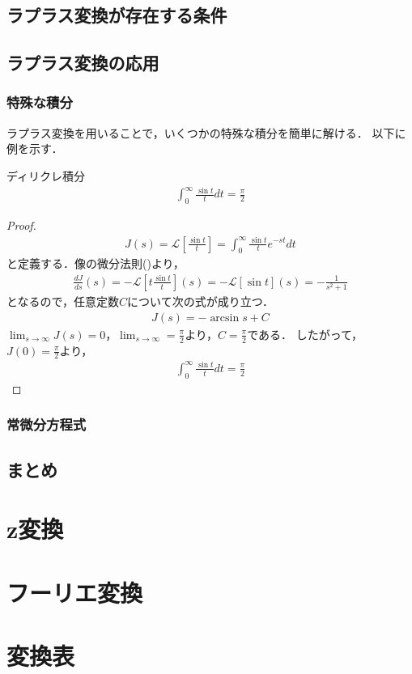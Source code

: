 \documentclass[uplatex, dvipdfmx, fleqn, a4paper, 10pt]{ujreport}
\begin{document}
\subsection{ラプラス変換が存在する条件}

\subsection{ラプラス変換の応用}

\subsubsection{特殊な積分}

ラプラス変換を用いることで，いくつかの特殊な積分を簡単に解ける．
以下に例を示す．

\begin{exprbox}{ディリクレ積分}
    \begin{eqnarray}
        \int_{0}^{\infty} \frac{\sin t}{t} dt = \frac{\pi}{2}
    \end{eqnarray}
    \begin{proof}
        \begin{eqnarray*}
            J(s) = \mathcal{L}\left[\frac{\sin t}{t}\right] = \int_{0}^{\infty} \frac{\sin t}{t} e^{-st} dt
        \end{eqnarray*}
        と定義する．像の微分法則()より，
        \begin{eqnarray*}
            \frac{dJ}{ds}(s) = - \mathcal{L}\left[t \frac{\sin t}{t}\right](s) = -\mathcal{L}[\sin t](s) = - \frac{1}{s^2 + 1}
        \end{eqnarray*}
        となるので，任意定数$C$について次の式が成り立つ．
        \begin{eqnarray*}
            J(s) = -\arcsin s + C
        \end{eqnarray*}
        $\lim_{s \to \infty} J(s) = 0$，$\lim_{s \to \infty} = \frac{\pi}{2}$より，$C = \frac{\pi}{2}$である．
        したがって，$J(0) = \frac{\pi}{2}$より，
        \begin{eqnarray*}
            \int_{0}^{\infty} \frac{\sin t}{t} dt = \frac{\pi}{2}
        \end{eqnarray*}
    \end{proof}
\end{exprbox}

\subsubsection{常微分方程式}

\subsection{まとめ}

\section{z変換}\label{sec:z_transform}

\section{フーリエ変換}\label{sec:fourier_transform}

\section{変換表}

\newpage
\end{document}
